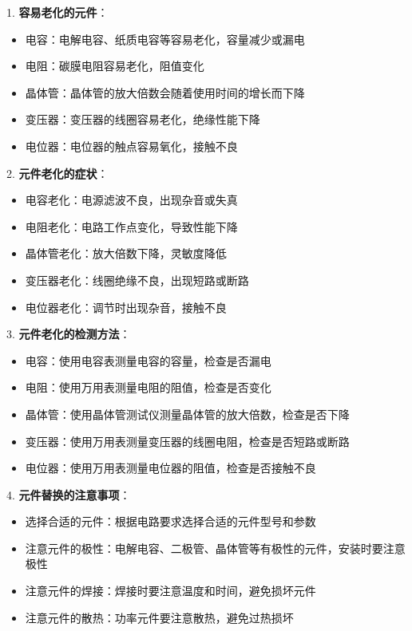 \documentclass[12pt,UTF8]{ctexbook}
\begin{document}
1. \textbf{容易老化的元件}：
   \begin{itemize}[leftmargin=3.5em]
   \item 电容：电解电容、纸质电容等容易老化，容量减少或漏电
   \item 电阻：碳膜电阻容易老化，阻值变化
   \item 晶体管：晶体管的放大倍数会随着使用时间的增长而下降
   \item 变压器：变压器的线圈容易老化，绝缘性能下降
   \item 电位器：电位器的触点容易氧化，接触不良
   \end{itemize}

2. \textbf{元件老化的症状}：
   \begin{itemize}[leftmargin=3.5em]
   \item 电容老化：电源滤波不良，出现杂音或失真
   \item 电阻老化：电路工作点变化，导致性能下降
   \item 晶体管老化：放大倍数下降，灵敏度降低
   \item 变压器老化：线圈绝缘不良，出现短路或断路
   \item 电位器老化：调节时出现杂音，接触不良
   \end{itemize}

3. \textbf{元件老化的检测方法}：
   \begin{itemize}[leftmargin=3.5em]
   \item 电容：使用电容表测量电容的容量，检查是否漏电
   \item 电阻：使用万用表测量电阻的阻值，检查是否变化
   \item 晶体管：使用晶体管测试仪测量晶体管的放大倍数，检查是否下降
   \item 变压器：使用万用表测量变压器的线圈电阻，检查是否短路或断路
   \item 电位器：使用万用表测量电位器的阻值，检查是否接触不良
   \end{itemize}

4. \textbf{元件替换的注意事项}：
   \begin{itemize}[leftmargin=3.5em]
   \item 选择合适的元件：根据电路要求选择合适的元件型号和参数
   \item 注意元件的极性：电解电容、二极管、晶体管等有极性的元件，安装时要注意极性
   \item 注意元件的焊接：焊接时要注意温度和时间，避免损坏元件
   \item 注意元件的散热：功率元件要注意散热，避免过热损坏
   \end{itemize}
\end{document}
